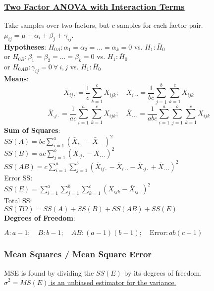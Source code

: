 \documentclass{article}
\begin{document}
\begin{multicols*}{2}
\subsubsection*{\underline{Two Factor ANOVA with Interaction Terms}}
Take samples over two factors, but $c$ samples for each factor pair. $\mu_{ij} = \mu + \alpha_{i} + \beta_{j} + \gamma_{ij}$.\\
\textbf{Hypotheses}: $H_{0A}: \alpha_{1} = \alpha_{2} = \dots = \alpha_{k} = 0$ vs. $H_{1}: \bar{H}_{0}$\\
or $H_{0B}: \beta_{1} = \beta_{2} = \dots = \beta_{k} = 0$ vs. $H_{1}: \bar{H}_{0}$\\
or $H_{0AB}: \gamma_{ij} = 0\ \forall\ i, j$ vs. $H_{1}: \bar{H}_{0}$\\
\textbf{Means}:
$$\bar{X}_{i j \cdot} = \frac{1}{c} \sum_{k=1}^{c} X_{ijk}; \quad \bar{X}_{i \cdot \cdot} = \frac{1}{bc} \sum_{j=1}^{b} \sum_{k=1}^{c} X_{ijk}$$
$$ \bar{X}_{\cdot j \cdot} = \frac{1}{ac} \sum_{i=1}^{a} \sum_{k=1}^{c} X_{ijk}; \quad \bar{X}_{\cdot \cdot \cdot} = \frac{1}{abc} \sum_{i=1}^{a} \sum_{j=1}^{b} \sum_{k=1}^{c} X_{ijk}$$
\textbf{Sum of Squares}:\\
$SS(A) = bc \sum_{i=1}^{a} (\bar{X}_{i \cdot \cdot} - \bar{X}_{\cdot \cdot \cdot})^{2}$\\
$SS(B) = ac \sum_{j=1}^{b} (\bar{X}_{\cdot j \cdot} - \bar{X}_{\cdot \cdot \cdot})^{2}$\\
$SS(AB) = c \sum_{i=1}^{a} \sum_{j=1}^{b} (\bar{X}_{i j \cdot} - \bar{X}_{i \cdot \cdot} - \bar{X}_{\cdot j \cdot} + \bar{X}_{\cdot \cdot \cdot})^{2}$\\
Error SS:\\
$SS(E) = \sum_{i=1}^{a} \sum_{j=1}^{b} \sum_{k=1}^{c} (X_{ijk} - \bar{X}_{i j \cdot})^{2}$\\
Total SS:\\
$SS(TO) = SS(A) + SS(B) + SS(AB) + SS(E)$\\
\textbf{Degrees of Freedom}:\\
\centerline{$A: a-1; \quad B: b-1; \quad AB: (a-1)(b-1); \quad \mbox{Error}: ab(c-1)$}

\subsubsection*{Mean Squares / Mean Square Error}
MSE is found by dividing the $SS(E)$ by its degrees of freedom.\\
\underline{$\hat{\sigma}^{2} = MS(E)$ is an unbiased estimator for the variance.} 


\end{multicols*}
\end{document}
